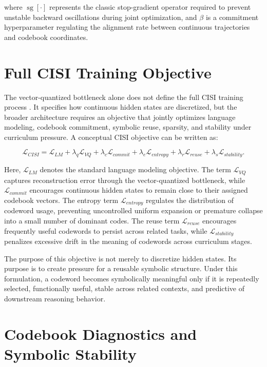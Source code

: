 where $\operatorname{sg}[\cdot]$ represents the classic stop-gradient operator required to prevent unstable backward oscillations during joint optimization, and $\beta$ is a commitment hyperparameter regulating the alignment rate between continuous trajectories and codebook coordinates.

\section{Full CISI Training Objective}

The vector-quantized bottleneck alone does not define the full CISI training process \cite{VanDenOord2017}. It specifies how continuous hidden states are discretized, but the broader architecture requires an objective that jointly optimizes language modeling, codebook commitment, symbolic reuse, sparsity, and stability under curriculum pressure. A conceptual CISI objective can be written as:

\begin{equation}
\mathcal{L}_{CISI}
=
\mathcal{L}_{LM}
+
\lambda_q \mathcal{L}_{VQ}
+
\lambda_c \mathcal{L}_{commit}
+
\lambda_e \mathcal{L}_{entropy}
+
\lambda_r \mathcal{L}_{reuse}
+
\lambda_s \mathcal{L}_{stability}.
\end{equation}

Here, $\mathcal{L}_{LM}$ denotes the standard language modeling objective. The term $\mathcal{L}_{VQ}$ captures reconstruction error through the vector-quantized bottleneck, while $\mathcal{L}_{commit}$ encourages continuous hidden states to remain close to their assigned codebook vectors. The entropy term $\mathcal{L}_{entropy}$ regulates the distribution of codeword usage, preventing uncontrolled uniform expansion or premature collapse into a small number of dominant codes. The reuse term $\mathcal{L}_{reuse}$ encourages frequently useful codewords to persist across related tasks, while $\mathcal{L}_{stability}$ penalizes excessive drift in the meaning of codewords across curriculum stages.

The purpose of this objective is not merely to discretize hidden states. Its purpose is to create pressure for a reusable symbolic structure. Under this formulation, a codeword becomes symbolically meaningful only if it is repeatedly selected, functionally useful, stable across related contexts, and predictive of downstream reasoning behavior.

\section{Codebook Diagnostics and Symbolic Stability}

